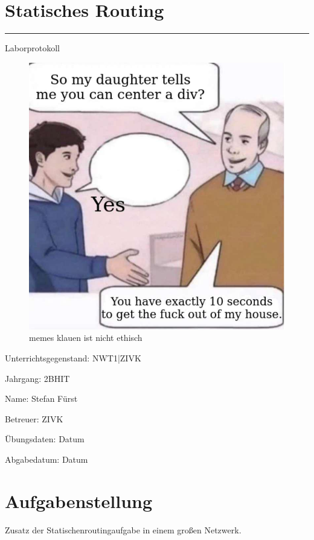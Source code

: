 \documentclass[a4paper]{article}
\begin{document}
\pagestyle{oida}
\section*{Statisches Routing}
\par\noindent\rule{\textwidth}{0.4pt}

Laborprotokoll

\begin{figure}[h]
	\includegraphics[scale=0.6]{meme.jpeg}
	\caption{memes klauen ist nicht ethisch}
\end{figure}

\vspace*{\fill}
Unterrichtsgegenstand:	NWT1|ZIVK

Jahrgang:	2BHIT

Name:	Stefan Fürst

Betreuer: 	ZIVK

Übungsdaten:	Datum

Abgabedatum:	Datum


\newpage
\tableofcontents

\newpage

\section{Aufgabenstellung}
Zusatz der Statischenroutingaufgabe in einem großen Netzwerk.
\end{document}
